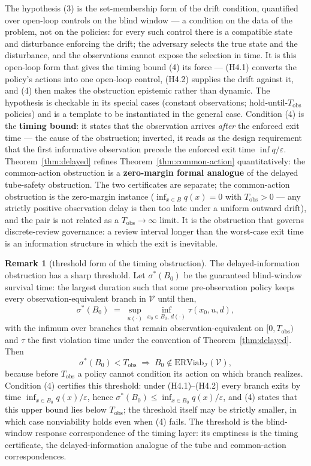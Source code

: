 \documentclass[11pt]{article}
\theoremstyle{definition}
\newtheorem{remark}{Remark}
\begin{document}
The hypothesis (3) is the set-membership form of the drift condition,
quantified over open-loop controls on the blind window --- a condition
on the data of the problem, not on the policies: for every such control
there is a compatible state and disturbance enforcing the drift; the
adversary selects the true state and the disturbance, and the
observations cannot expose the selection in time. It is this open-loop form that gives the timing bound (4) its force --- (H4.1) converts
the policy's actions into one open-loop control, (H4.2) supplies the
drift against it, and (4) then makes the obstruction epistemic rather
than dynamic. The hypothesis is checkable in its special cases (constant
observations; hold-until-\(T_{\mathrm{obs}}\) policies) and is a template to be instantiated in the general case. Condition (4) is
the \textbf{timing bound}: it states that the observation arrives
\emph{after} the enforced exit time --- the cause of the obstruction; inverted, it reads as the design requirement that the first informative observation precede the enforced exit time
\(\inf q / \varepsilon\). Theorem~\ref{thm:delayed} refines Theorem~\ref{thm:common-action} quantitatively:
the common-action obstruction is a \textbf{zero-margin formal analogue}
of the delayed tube-safety obstruction. The two certificates are separate; the common-action obstruction is the zero-margin instance
(\(\inf_{x \in B} q(x) = 0\) with \(T_{\mathrm{obs}} > 0\) --- any
strictly positive observation delay is then too late under a uniform
outward drift), and the pair is not related as a
\(T_{\mathrm{obs}} \to \infty\) limit. It is the obstruction that
governs discrete-review governance: a review interval longer than the
worst-case exit time is an information structure in which the exit is inevitable.

\begin{remark}[threshold form of the timing obstruction]\label{rem:sigma}
The delayed-information obstruction has a sharp threshold. Let
\(\sigma^*(B_0)\) be the guaranteed blind-window survival time: the
largest duration such that some pre-observation policy keeps every
observation-equivalent branch in \(\mathcal{V}\) until then,
\[\sigma^*(B_0) \;=\; \sup_{u(\cdot)} \inf_{x_0\in B_0,\, d(\cdot)} \tau(x_0,u,d),\]
with the infimum over branches that remain observation-equivalent on
\([0,T_{\mathrm{obs}})\) and \(\tau\) the first violation time under the
convention of Theorem~\ref{thm:delayed}. Then
\[\sigma^*(B_0) < T_{\mathrm{obs}} \;\Longrightarrow\; B_0 \notin \mathrm{ERViab}_{\mathcal{I}}(\mathcal{V}),\]
because before \(T_{\mathrm{obs}}\) a policy cannot condition its action
on which branch realizes. Condition (4) certifies this threshold: under
(H4.1)--(H4.2) every branch exits by time
\(\inf_{x\in B_0}q(x)/\varepsilon\), hence
\(\sigma^*(B_0)\le\inf_{x\in B_0}q(x)/\varepsilon\), and (4) states that
this upper bound lies below \(T_{\mathrm{obs}}\); the threshold itself
may be strictly smaller, in which case nonviability holds even when (4)
fails. The threshold is the blind-window response correspondence of the
timing layer: its emptiness is the timing certificate, the
delayed-information analogue of the tube and common-action
correspondences.
\end{remark}
\end{document}
